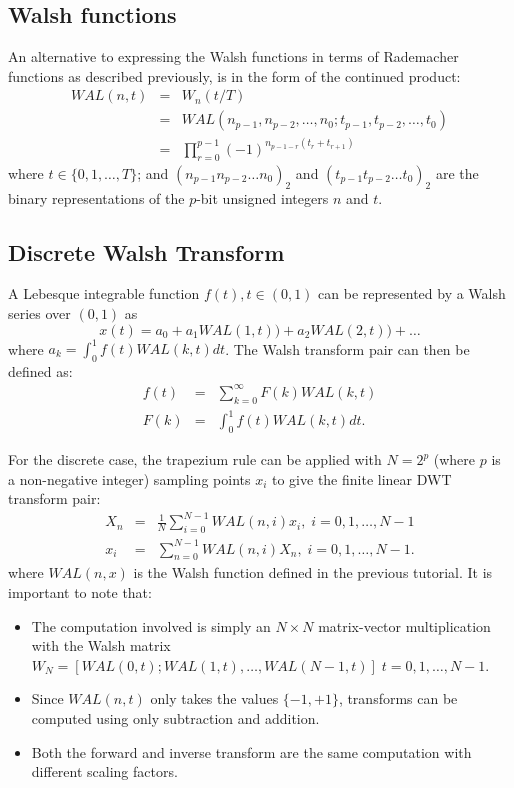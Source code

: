 \subsection{Walsh functions}
An alternative to expressing the Walsh functions in terms of Rademacher
functions as described previously, is in the form of the continued product:
\begin{eqnarray}
WAL(n, t) & = & W_n(t/T) \\
 &=& WAL(n_{p-1}, n_{p-2}, \ldots, n_0; t_{p-1}, t_{p-2}, \ldots, t_0) \\
 &=& \prod_{r=0}^{p-1} (-1)^{n_{p-1-r} (t_r + t_{r+1})}
\end{eqnarray}
where $t \in \{0,1,\ldots,T\}$; and
$(n_{p-1} n_{p-2} \ldots n_0)_2$ 
and $(t_{p-1} t_{p-2} \ldots t_0)_2$ are the 
binary representations of the $p$-bit unsigned integers $n$ and $t$. 

\subsection{Discrete Walsh Transform}
A Lebesque integrable function $f(t), t \in (0,1)$ can be represented 
by a Walsh series over $(0,1)$ as
\begin{equation}
x(t) = a_0 + a_1 WAL(1, t)) + a_2 WAL(2, t)) + \ldots
\end{equation}
where $a_k=\int_0^1 f(t) WAL(k, t) dt$. The Walsh transform pair can then
be defined as:
\begin{eqnarray}
f(t) & = & \sum_{k=0}^\infty F(k) WAL(k, t)\\
F(k) & = & \int_0^1 f(t) WAL(k, t) dt.
\end{eqnarray}

For the discrete case, the trapezium rule can be applied 
with $N=2^p$ (where $p$ is a non-negative integer) sampling points $x_i$
to give the finite linear DWT transform pair:
\begin{eqnarray}
X_n &=& \frac{1}{N} \sum_{i=0}^{N-1} WAL(n, i) x_i,\; i = 0, 1, \ldots, N-1\\
x_i &=& \sum_{n=0}^{N-1} WAL(n, i) X_n,\; i = 0, 1, \ldots, N-1.
\end{eqnarray}
where $WAL(n, x)$ is the Walsh function defined in the previous tutorial.
It is important to note that:
\begin{itemize}
\item The computation involved is simply an $N\times N$ matrix-vector multiplication
with the Walsh matrix 
$W_N = [WAL(0,t); WAL(1,t), \ldots, WAL({N-1},t)]\; t=0, 1, \ldots, N-1$.
\item Since $WAL(n,t)$ only takes the values $\{-1,+1\}$, transforms
can be computed using only subtraction and addition.
\item Both the forward and inverse transform are the same computation
with different scaling factors.
\end{itemize}

